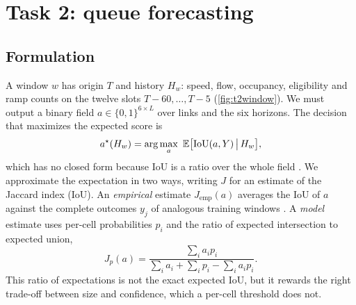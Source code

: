 \section{Task 2: queue forecasting}\label{sec:queue}

\subsection{Formulation}
A window $w$ has origin $T$ and history $H_w$: speed, flow, occupancy, eligibility and ramp counts on the twelve slots
$T{-}60,\dots,T{-}5$ (\cref{fig:t2window}). We must output a binary field $a\in\{0,1\}^{6\times L}$ over links and the
six horizons. The decision that maximizes the expected score is
\begin{equation}
  a^\star(H_w) = \arg\max_{a}\ \mathbb E\big[\mathrm{IoU}(a,Y)\,\big|\,H_w\big],
  \label{eq:bayes}
\end{equation}
which has no closed form because IoU is a ratio over the whole field \cite{nowozin2014}. We approximate the
expectation in two ways, writing $J$ for an estimate of the Jaccard index (IoU). An \emph{empirical} estimate
$J_{\mathrm{emp}}(a)$ averages the IoU of $a$ against the complete outcomes $y_j$ of analogous training windows
\cite{lorenz1969}. A \emph{model} estimate uses per-cell probabilities $p_i$ and the ratio of expected intersection to
expected union,
\begin{equation}
  J_p(a) = \frac{\sum_i a_i p_i}{\sum_i a_i + \sum_i p_i - \sum_i a_i p_i}.
  \label{eq:modeliou}
\end{equation}
This ratio of expectations is not the exact expected IoU, but it rewards the right trade-off between size and
confidence, which a per-cell threshold does not.

